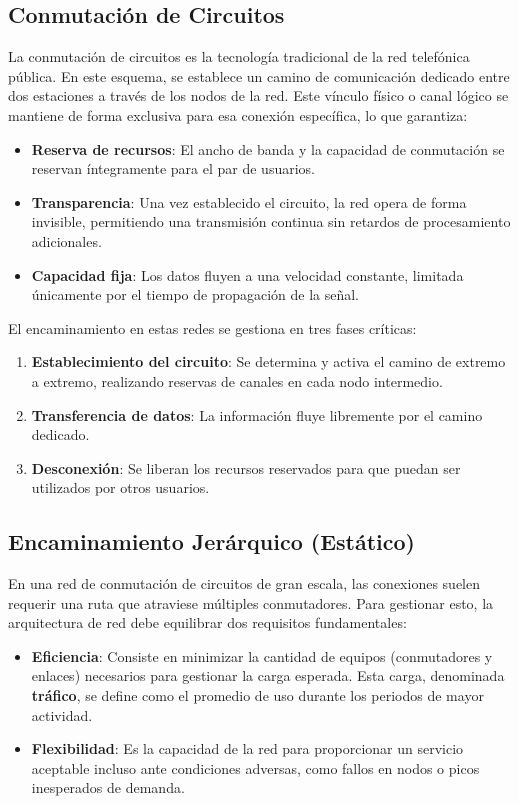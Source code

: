 \subsection{Conmutación de Circuitos}

La conmutación de circuitos es la tecnología tradicional de la red telefónica pública. En este esquema, se establece un camino de comunicación dedicado entre dos estaciones a través de los nodos de la red. Este vínculo físico o canal lógico se mantiene de forma exclusiva para esa conexión específica, lo que garantiza:

\begin{itemize}
	\item \textbf{Reserva de recursos}: El ancho de banda y la capacidad de conmutación se reservan íntegramente para el par de usuarios.
	\item \textbf{Transparencia}: Una vez establecido el circuito, la red opera de forma invisible, permitiendo una transmisión continua sin retardos de procesamiento adicionales.
	\item \textbf{Capacidad fija}: Los datos fluyen a una velocidad constante, limitada únicamente por el tiempo de propagación de la señal.
\end{itemize}

El encaminamiento en estas redes se gestiona en tres fases críticas:

\begin{enumerate}
	\item \textbf{Establecimiento del circuito}: Se determina y activa el camino de extremo a extremo, realizando reservas de canales en cada nodo intermedio.
	\item \textbf{Transferencia de datos}: La información fluye libremente por el camino dedicado.
	\item \textbf{Desconexión}: Se liberan los recursos reservados para que puedan ser utilizados por otros usuarios.
\end{enumerate}

\subsection{Encaminamiento Jerárquico (Estático)}

En una red de conmutación de circuitos de gran escala, las conexiones suelen requerir una ruta que atraviese múltiples conmutadores. Para gestionar esto, la arquitectura de red debe equilibrar dos requisitos fundamentales:

\begin{itemize}
	\item \textbf{Eficiencia}: Consiste en minimizar la cantidad de equipos (conmutadores y enlaces) necesarios para gestionar la carga esperada. Esta carga, denominada \textbf{tráfico}, se define como el promedio de uso durante los periodos de mayor actividad.
	\item \textbf{Flexibilidad}: Es la capacidad de la red para proporcionar un servicio aceptable incluso ante condiciones adversas, como fallos en nodos o picos inesperados de demanda.
\end{itemize}

